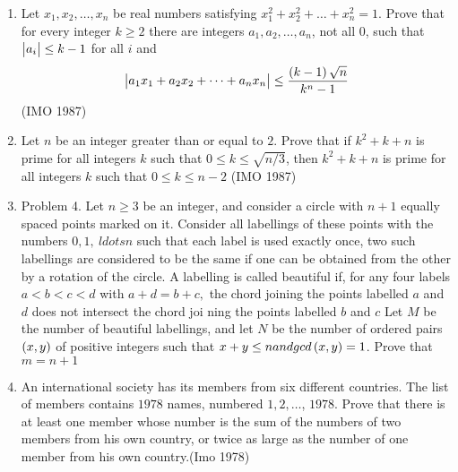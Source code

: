 \begin{enumerate}
\item Let $x_1, x_2, \dots, x_n$ be real numbers satisfying $x^2_1 +x^2_2 +\dots+x^2_n = 1$. Prove that for every integer $k\geq2$ there are integers $a_1, a_2, \dots , a_n$, not all $0$, such that $\begin{vmatrix}a_i\end{vmatrix}\leq k-1$ for all $i$ and 
                     \begin{align*} \begin{vmatrix}a_1x_1+a_2x_2+\dots+a_nx_n\end{vmatrix} \leq \frac{\left(k-1\right)\sqrt{n}}{k^n-1} \end{align*}\hfill(IMO 1987)
	 \item Let $n$ be an integer greater than or equal to $2$. Prove that if $k^2+k+n$ is prime for all integers $k$ such that $0\leq k\leq \sqrt{n/3}$, then $k^2+k+n$ is prime for all integers $k$ such that $0\leq k\leq n-2$ \hfill(IMO 1987)
 \item Problem 4. Let $n \geq  3$ be an integer, and consider a circle with $n+1$ equally spaced points marked on it. Consider all labellings of these points with the numbers $0,1,\    ldots n$ such that each label is used exactly once, two such labellings are considered to be the same if one can be obtained from the other by a rotation of the circle. A labelling     is called beautiful if, for any four labels $a< b<c < d$ with $a+d=b+c,$ the chord joining the points labelled $a$ and $d$ does not intersect the chord joi    ning the points labelled $b$ and $c$                                                                                                                                                                                                                                                                                                                                     Let $M$ be the number of beautiful labellings, and let $N$ be the number of ordered pairs $\left(x, y\right)$ of  positive integers such that $x+y\leq n and gcd \left(x,y\right) = 1$. Prove that                                                                                                                                                                                                                                                                                                                                $m=n+1$  
 \item An international society has its members from six different countries. The list of members contains $1978$ names, numbered $1, 2,\ldots$, $1978$. Prove that there is at least one member whose number is the sum of the numbers of two members from his own country, or twice as large as the number of one member from his own country.\hfill(Imo 1978)


\end{enumerate}
